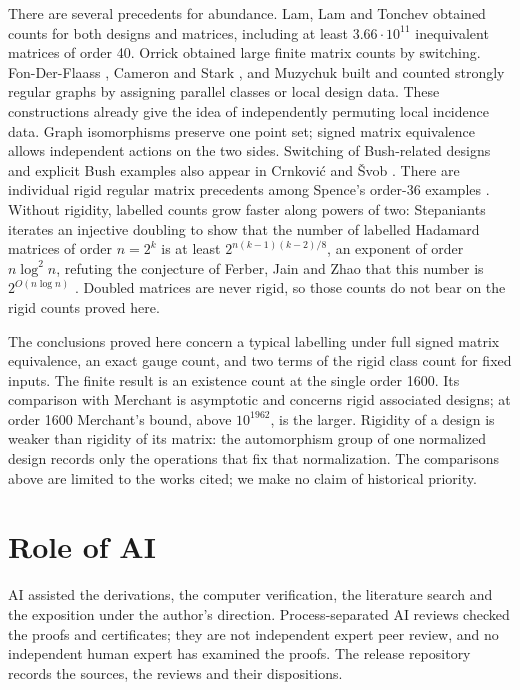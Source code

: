 \documentclass[11pt,reqno]{amsart}
\theoremstyle{remark}\newtheorem{remark}[theorem]{Remark}
\begin{document}
There are several precedents for abundance. Lam, Lam and Tonchev \cite{llt} obtained counts for both designs and matrices, including at least \(3.66\cdot10^{11}\) inequivalent matrices of order 40. Orrick \cite{orrick} obtained large finite matrix counts by switching. Fon-Der-Flaass \cite{fdf}, Cameron and Stark \cite{cs}, and Muzychuk \cite{muzychuk} built and counted strongly regular graphs by assigning parallel classes or local design data. These constructions already give the idea of independently permuting local incidence data. Graph isomorphisms preserve one point set; signed matrix equivalence allows independent actions on the two sides. Switching of Bush-related designs and explicit Bush examples also appear in Crnkovi\'c and \v Svob \cite{csv}. There are individual rigid regular matrix precedents among Spence's order-36 examples \cite{spence}. Without rigidity, labelled counts grow faster along powers of two: Stepaniants \cite{fr12} iterates an injective doubling to show that the number of labelled Hadamard matrices of order \(n=2^k\) is at least \(2^{n(k-1)(k-2)/8}\), an exponent of order \(n\log^2 n\), refuting the conjecture of Ferber, Jain and Zhao that this number is \(2^{O(n\log n)}\) \cite{fjz}. Doubled matrices are never rigid, so those counts do not bear on the rigid counts proved here.

The conclusions proved here concern a typical labelling under full signed matrix equivalence, an exact gauge count, and two terms of the rigid class count for fixed inputs. The finite result is an existence count at the single order 1600. Its comparison with Merchant is asymptotic and concerns rigid associated designs; at order 1600 Merchant's bound, above \(10^{1962}\), is the larger. Rigidity of a design is weaker than rigidity of its matrix: the automorphism group of one normalized design records only the operations that fix that normalization. The comparisons above are limited to the works cited; we make no claim of historical priority.

\section*{Role of AI}
AI assisted the derivations, the computer verification, the literature search and the exposition under the author's direction. Process-separated AI reviews checked the proofs and certificates; they are not independent expert peer review, and no independent human expert has examined the proofs. The release repository records the sources, the reviews and their dispositions.
\end{document}
